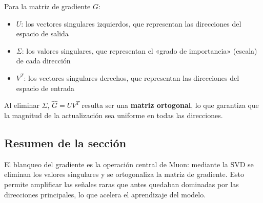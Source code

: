 Para la matriz de gradiente $G$:
\begin{itemize}
  \item $U$: los vectores singulares izquierdos, que representan las direcciones del espacio de salida
  \item $\Sigma$: los valores singulares, que representan el «grado de importancia» (escala) de cada dirección
  \item $V^T$: los vectores singulares derechos, que representan las direcciones del espacio de entrada
\end{itemize}

Al eliminar $\Sigma$, $\hat{G} = UV^T$ resulta ser una \textbf{matriz ortogonal}, lo que garantiza que la magnitud de la actualización sea uniforme en todas las direcciones.

\subsection{Resumen de la sección}

El blanqueo del gradiente es la operación central de Muon: mediante la SVD se eliminan los valores singulares y se ortogonaliza la matriz de gradiente. Esto permite amplificar las señales raras que antes quedaban dominadas por las direcciones principales, lo que acelera el aprendizaje del modelo.
